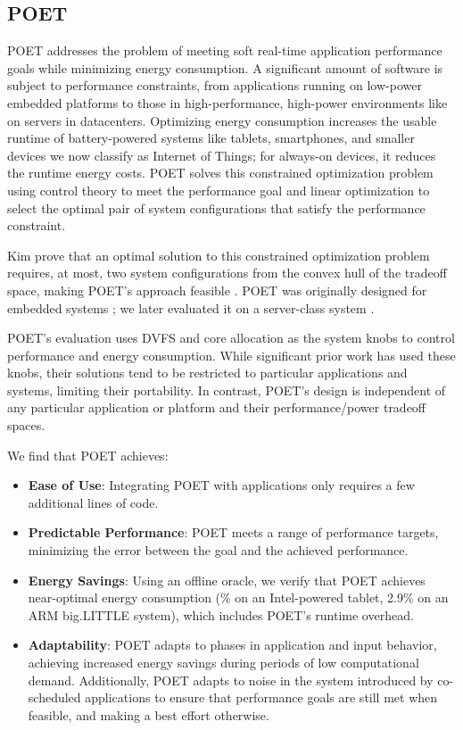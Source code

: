 \subsection{POET}

POET addresses the problem of meeting soft real-time application performance goals while minimizing energy consumption.
A significant amount of software is subject to performance constraints, from applications running on low-power embedded platforms to those in high-performance, high-power environments like on servers in datacenters.
Optimizing energy consumption increases the usable runtime of battery-powered systems like tablets, smartphones, and smaller devices we now classify as Internet of Things; for always-on devices, it reduces the runtime energy costs.
POET solves this constrained optimization problem using control theory to meet the performance goal and linear optimization to select the optimal pair of system configurations that satisfy the performance constraint.

Kim \etal prove that an optimal solution to this constrained optimization problem requires, at most, two system configurations from the convex hull of the tradeoff space, making POET's approach feasible \cite{kim-cpsna2015}.
POET was originally designed for embedded systems \cite{POET,ImesMS}; we later evaluated it on a server-class system \cite{POETMCSoC}.

POET's evaluation uses DVFS and core allocation as the system knobs to control performance and energy consumption.
While significant prior work has used these knobs, their solutions tend to be restricted to particular applications and systems, limiting their portability.
In contrast, POET's design is independent of any particular application or platform and their performance/power tradeoff spaces.

We find that POET achieves:
\begin{itemize}
\item \textbf{Ease of Use}: Integrating POET with applications only requires a few additional lines of code.
\item \textbf{Predictable Performance}: POET meets a range of performance targets, minimizing the error between the goal and the achieved performance.
\item \textbf{Energy Savings}: Using an offline oracle, we verify that POET achieves near-optimal energy consumption (\% on an Intel-powered tablet, 2.9\% on an ARM big.LITTLE system), which includes POET's runtime overhead.
\item \textbf{Adaptability}: POET adapts to phases in application and input behavior, achieving increased energy savings during periods of low computational demand.
Additionally, POET adapts to noise in the system introduced by co-scheduled applications to ensure that performance goals are still met when feasible, and making a best effort otherwise.
\end{itemize}


